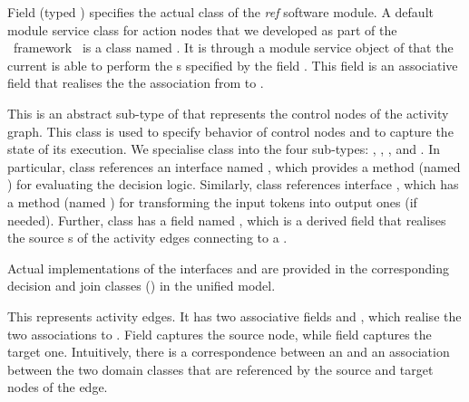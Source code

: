 \begin{description}
Field  (typed ) specifies the actual  class of the \textit{ref} software module. 
A default module service class for action nodes that we developed as part of the \jdomainapp~framework~\cite{le_jdomainapp_2017} is a class named .
It is through a module service object of  that the current  is able to perform the s specified by the field . This field is an associative field that realises the the association from  to .
%
\item[\clazz{ControlNode}.] This is an abstract sub-type of  that represents the control nodes of the activity graph. This class is used to specify behavior of control nodes and to capture the state of its execution. We specialise class  into the four sub-types: , , , and . 
In particular, class  references an interface named , which provides a method (named ) for evaluating the decision logic. Similarly, class  references interface , which has a method (named ) for transforming the input tokens into output ones (if needed).
Further, class  has a field named , which is a derived field that realises the source s of the activity edges connecting to a .

Actual implementations of the interfaces  and  are provided in the corresponding decision and join classes (\resp) in the unified model.
%
\item[\clazz{Edge}.] This represents activity edges. It has two associative fields  and , which realise the two associations to . Field  captures the source node, while field  captures the target one. Intuitively, there is a correspondence between an  and an association between the two domain classes that are referenced by the source and target nodes of the edge.
\end{description}

